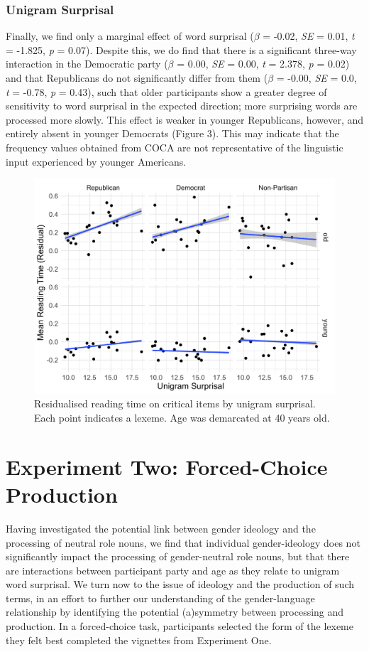 \documentclass[10pt,letterpaper]{article}
\begin{document}
	\subsubsection{Unigram Surprisal}
	Finally, we find only a marginal effect of word surprisal ($\beta$ = -0.02, \textit{SE} = 0.01, \textit{t} = -1.825, \textit{p} = 0.07). Despite this, we do find that there is a significant three-way interaction in the Democratic party ($\beta$ = 0.00, \textit{SE} = 0.00, \textit{t} = 2.378, \textit{p} = 0.02) and that Republicans do not significantly differ from them ($\beta$ = -0.00, \textit{SE} = 0.0, \textit{t} = -0.78, \textit{p} = 0.43), such that older participants show a greater degree of sensitivity to word surprisal in the expected direction; more surprising words are processed more slowly. This effect is weaker in younger Republicans, however, and entirely absent in younger Democrats (Figure 3). This may indicate that the frequency values obtained from COCA are not representative of the linguistic input experienced by younger Americans.
	
	\begin{figure}[h!]
		\centering
		\includegraphics[scale=0.115]{proc-freq-party.png}
		\caption{Residualised reading time on critical items by unigram surprisal. Each point indicates a lexeme. Age was demarcated at 40 years old.}
	\end{figure}
	
	\section{Experiment Two: Forced-Choice Production}
	Having investigated the potential link between gender ideology and the processing of neutral role nouns, we find that individual gender-ideology does not significantly impact the processing of gender-neutral role nouns, but that there are interactions between participant party and age as they relate to unigram word surprisal. We turn now to the issue of ideology and the production of such terms, in an effort to further our understanding of the gender-language relationship by identifying the potential (a)symmetry between processing and production. In a forced-choice task, participants selected the form of the lexeme they felt best completed the vignettes from Experiment One.
	
\end{document}
